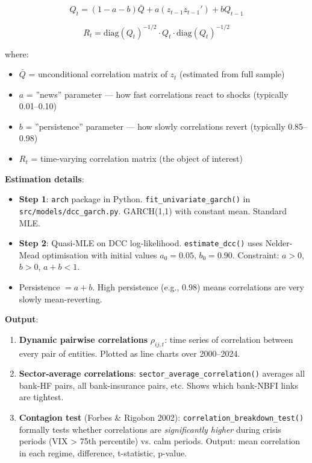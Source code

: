 \documentclass[11pt,a4paper]{article}
\begin{document}
\[Q_t = (1 - a - b)\bar{Q} + a(z_{t-1}z_{t-1}') + b Q_{t-1}\]

\[R_t = \text{diag}(Q_t)^{-1/2} \cdot Q_t \cdot \text{diag}(Q_t)^{-1/2}\]

where:
\begin{itemize}
\item $\bar{Q}$ = unconditional correlation matrix of $z_t$ (estimated from full sample)
\item $a$ = ''news'' parameter --- how fast correlations react to shocks (typically 0.01--0.10)
\item $b$ = ''persistence'' parameter --- how slowly correlations revert (typically 0.85--0.98)
\item $R_t$ = time-varying correlation matrix (the object of interest)

\end{itemize}
\textbf{Estimation details}:
\begin{itemize}
\item \textbf{Step 1}: \texttt{arch} package in Python. \texttt{fit\_univariate\_garch()} in \texttt{src/models/dcc\_garch.py}. GARCH(1,1) with constant mean. Standard MLE.
\item \textbf{Step 2}: Quasi-MLE on DCC log-likelihood. \texttt{estimate\_dcc()} uses Nelder-Mead optimisation with initial values $a_0 = 0.05$, $b_0 = 0.90$. Constraint: $a > 0$, $b > 0$, $a + b < 1$.
\item Persistence $= a + b$. High persistence (e.g., $0.98$) means correlations are very slowly mean-reverting.

\end{itemize}
\textbf{Output}:
\begin{enumerate}
\item \textbf{Dynamic pairwise correlations} $\rho_{ij,t}$: time series of correlation between every pair of entities. Plotted as line charts over 2000--2024.
\item \textbf{Sector-average correlations}: \texttt{sector\_average\_correlation()} averages all bank-HF pairs, all bank-insurance pairs, etc. Shows which bank-NBFI links are tightest.
\item \textbf{Contagion test} (Forbes \& Rigobon 2002): \texttt{correlation\_breakdown\_test()} formally tests whether correlations are \textit{significantly higher} during crisis periods (VIX > 75th percentile) vs. calm periods. Output: mean correlation in each regime, difference, t-statistic, p-value.

\end{enumerate}
\end{document}
